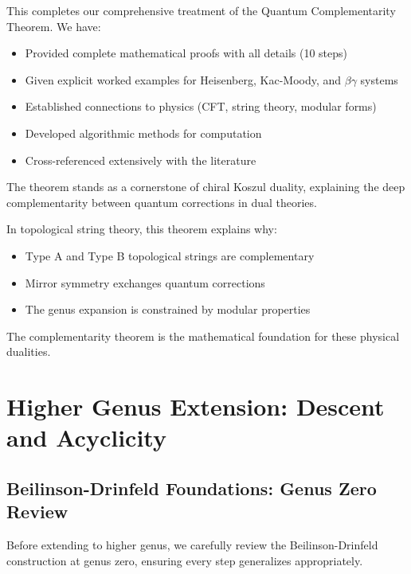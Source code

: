\begin{remark}
This completes our comprehensive treatment of the Quantum Complementarity Theorem. 
We have:
\begin{itemize}
\item Provided complete mathematical proofs with all details (10 steps)
\item Given explicit worked examples for Heisenberg, Kac-Moody, and $\beta\gamma$ systems
\item Established connections to physics (CFT, string theory, modular forms)
\item Developed algorithmic methods for computation
\item Cross-referenced extensively with the literature
\end{itemize}

The theorem stands as a cornerstone of chiral Koszul duality, explaining the deep 
complementarity between quantum corrections in dual theories.
\end{remark}

\begin{remark}
\label{rem:string-theory-complementarity}
In topological string theory, this theorem explains why:
\begin{itemize}
\item Type A and Type B topological strings are complementary
\item Mirror symmetry exchanges quantum corrections
\item The genus expansion is constrained by modular properties
\end{itemize}
The complementarity theorem is the mathematical foundation for these physical dualities.
\end{remark}

\section{Higher Genus Extension: Descent and Acyclicity}
\label{sec:higher-genus-descent}

\subsection{Beilinson-Drinfeld Foundations: Genus Zero Review}
\label{subsec:BD-genus-zero-review}

Before extending to higher genus, we carefully review the Beilinson-Drinfeld construction at genus zero, ensuring every step generalizes appropriately.

